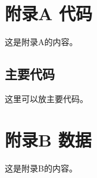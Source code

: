 \documentclass{sduthesis}
\begin{document}
\makecover

\tableofcontents

\appendix
\chapter{附录A 代码}
这是附录A的内容。

\section{主要代码}
这里可以放主要代码。



\chapter{附录B 数据}
这是附录B的内容。

\printbibliography
\end{document}
